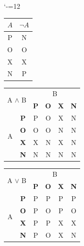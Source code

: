 \documentclass[a4paper,11pt]{article}
\begin{document}
\begin{table}[h]
    \label{table2}
    \catcode`-=12
    \begin{center}
        \begin{tabular}{|c|c|}
             \hline
              $A$ & $\neg A$ \\
             \hline 
               P & N  \\
             \hline
               O & O \\
             \hline
               X & X \\
            \hline
               N & P \\
            \hline
        \end{tabular}
            \begin{tabular}{|c|c|c|c|c|c|}
                \hline
                \multicolumn{2}{|c|}{\multirow{2}{*}{{A $\wedge$ B}}} & \multicolumn{4}{c|}{B} \\
                \cline{3-6}
                \multicolumn{2}{|c|}{} & \textbf{P} & \textbf{O} &\textbf{X}& \textbf{N} \\
                \hline
                \multirow{4}{*}{A} & \textbf{P} & P & O & X & N \\
                \cline{2-6}
                & \textbf{O} & O & O & N & N \\
                \cline{2-6}
                & \textbf{X} & X & N & X & N \\
                \cline{2-6}
                & \textbf{N} & N & N & N & N \\
                \hline
            \end{tabular}
            \begin{tabular}{|c|c|c|c|c|c|}
                \hline
                \multicolumn{2}{|c|}{\multirow{2}{*}{{A $\vee$ B}}} & \multicolumn{4}{c|}{B} \\
                \cline{3-6}
                \multicolumn{2}{|c|}{} & \textbf{P} & \textbf{O} &\textbf{X}& \textbf{N} \\
                \hline
                \multirow{4}{*}{A} & \textbf{P} & P & P & P & P \\
                \cline{2-6}
                & \textbf{O} & P & O & P & O \\
                \cline{2-6}
                & \textbf{X} & P & P & X & X \\
                \cline{2-6}
                & \textbf{N} & P & O & X & N \\
                \hline

\end{tabular}
\end{center}
\end{table}
\end{document}
